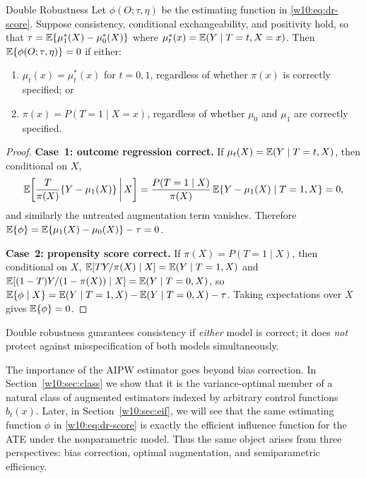 \documentclass[master.tex]{subfiles}
\begin{document}
\begin{thm}{Double Robustness}
\label{w10:thm:dr}
\label{w10:thm:dr}
Let $\phi(O;\tau,\eta)$ be the estimating function in
\eqref{w10:eq:dr-score}.  Suppose consistency, conditional
exchangeability, and positivity hold, so that
$\tau = \mathbb{E}\{\mu_1^*(X)-\mu_0^*(X)\}$ where
$\mu_t^*(x) = \mathbb{E}(Y\mid T=t,X=x)$.  Then
$\mathbb{E}\{\phi(O;\tau,\eta)\} = 0$ if either:
\begin{enumerate}
  \item $\mu_t(x) = \mu_t^*(x)$ for $t=0,1$, regardless of
    whether $\pi(x)$ is correctly specified; or
  \item $\pi(x) = P(T=1\mid X=x)$, regardless of whether $\mu_0$
    and $\mu_1$ are correctly specified.
\end{enumerate}
\end{thm}

\begin{proof}
\textbf{Case~1: outcome regression correct.}
If $\mu_t(X) = \mathbb{E}(Y\mid T=t,X)$, then conditional on $X$,
\[
  \mathbb{E}\!\left[\frac{T}{\pi(X)}\{Y-\mu_1(X)\}\,\middle|\,X\right]
  = \frac{P(T=1\mid X)}{\pi(X)}\,\mathbb{E}\{Y-\mu_1(X)\mid T=1,X\} = 0,
\]
and similarly the untreated augmentation term vanishes.  Therefore
$\mathbb{E}\{\phi\} = \mathbb{E}\{\mu_1(X)-\mu_0(X)\} - \tau = 0$.

\medskip\noindent
\textbf{Case~2: propensity score correct.}
If $\pi(X) = P(T=1\mid X)$, then conditional on $X$,
$\mathbb{E}[TY/\pi(X)\mid X] = \mathbb{E}(Y\mid T=1,X)$ and
$\mathbb{E}[(1-T)Y/(1-\pi(X))\mid X] = \mathbb{E}(Y\mid T=0,X)$, so
$\mathbb{E}\{\phi\mid X\} = \mathbb{E}(Y\mid T=1,X)-\mathbb{E}(Y\mid T=0,X)-\tau$.
Taking expectations over $X$ gives $\mathbb{E}\{\phi\} = 0$.
\end{proof}

\begin{remark}
\label{w10:rem:dr-scope}
Double robustness guarantees consistency if \emph{either} model is
correct; it does \emph{not} protect against misspecification of
both models simultaneously.
\end{remark}

The importance of the AIPW estimator goes beyond bias correction.  In
Section~\ref{w10:sec:class} we show that it is the variance-optimal
member of a natural class of augmented estimators indexed by arbitrary
control functions $b_t(x)$.  Later, in Section~\ref{w10:sec:eif}, we
will see that the same estimating function $\phi$ in
\eqref{w10:eq:dr-score} is exactly the efficient influence function
for the ATE under the nonparametric model.  Thus the same object
arises from three perspectives: bias correction, optimal augmentation,
and semiparametric efficiency.
\end{document}
